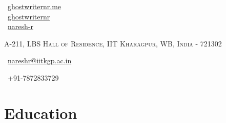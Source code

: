 \documentclass[a4paper,11pt]{extarticle} %
\begin{document}
\pagestyle{empty} %


\begin{multicols}{3}
\normalsize  \faGlobe\ {\href{http://ghostwriternr.me/}{ghostwriternr.me}}\\
\normalsize \faGithub\ {\href{https://github.com/ghostwriternr}{ghostwriternr}}\\
\normalsize  \faLinkedinSquare\ {\href{https://www.linkedin.com/in/naresh-r-464a8b8b}{naresh-r}}\\
\columnbreak
\normalsize\par{\par} %
\par{\centering\normalsize {\textsc{A-211, LBS Hall of Residence, IIT Kharagpur, WB, India - 721302}}\hfill\par}
\columnbreak
\raggedright\hfill\normalsize \faEnvelope\ {\href{mailto:nareshr@iitkgp.ac.in}{nareshr@iitkgp.ac.in}}\\
\raggedright\hfill{\faPhone\ +91-7872833729}
\end{multicols}


\vspace{-0.6cm}
\section{Education}
\end{document}
